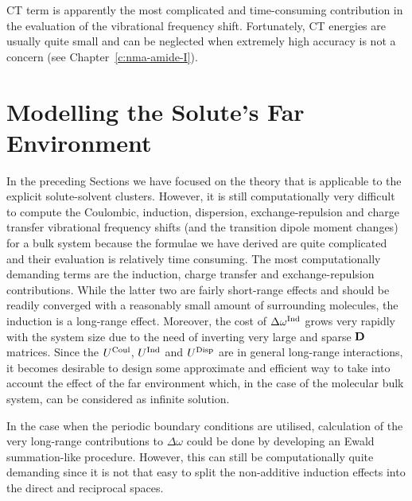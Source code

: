 \documentclass[b5paper,oneside,fleqn,11pt]{book}
\begin{document}
\begin{refsection}
CT term is apparently the most complicated and time\hyp{}consuming contribution
in the evaluation of the vibrational frequency shift.
Fortunately, CT energies are usually quite small
and can be neglected when extremely high accuracy is not
a concern (see Chapter~\ref{c:nma-amide-I}).

\section{Modelling the Solute's Far Environment\label{s:far-environ}}

In the preceding Sections we have focused on the
theory that is applicable to the explicit solute\hyp{}solvent
clusters. However, it is still computationally very difficult 
to compute the Coulombic, induction, dispersion, exchange\hyp{}repulsion
and charge transfer vibrational frequency shifts (and the transition dipole moment changes)
for a bulk system because the formulae we have derived are quite
complicated and their evaluation is relatively time consuming. The most computationally
demanding terms are the induction, charge transfer and exchange\hyp{}repulsion contributions.
While the latter two are fairly short\hyp{}range effects
and should be readily converged with a reasonably small amount of
surrounding molecules, the induction is a long\hyp{}range effect. Moreover,
the cost of $\Delta\omega^{\rm Ind}$ grows very rapidly with the system size
due to the need of inverting very large and sparse $\bf D$ matrices.
Since the $U^{\rm Coul}$, $U^{\rm Ind}$ and $U^{\rm Disp}$
are in general long\hyp{}range interactions, it becomes desirable
to design some approximate and efficient way to take into account the
effect of the far environment which, in the case of the molecular bulk 
system, can be considered as infinite solution.

In the case when the periodic boundary conditions are utilised, 
calculation of the very long\hyp{}range contributions to $\Delta\omega$ 
could be done by developing an Ewald summation\hyp{}like procedure.
However, this can still be computationally quite demanding since it is
not that easy to split the non\hyp{}additive induction effects
into the direct and reciprocal spaces.


\end{refsection}
\end{document}
